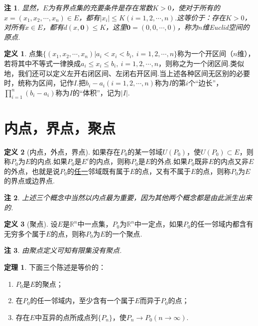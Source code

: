 \documentclass[lang=cn,12pt]{ctexart}
\theoremstyle{definition}
\newtheorem{definition}{定义}
\newtheorem{theorem}{定理}
\theoremstyle{plain}
\newtheorem*{remark}{注}
\begin{document}
\begin{remark}
	显然，$E$为有界点集的充要条件是存在常数$K>0$，使对于所有的$x=(x_1,x_2,\cdots,x_n)\in E$，都有$|x_i|\leqslant K(i=1,2,\cdots,n)$.这等价于：存在$K>0$，对所有$x\in E$，都有$d(x,\mathbf{0})\leqslant K$，这里$\mathbf{0}=(0,0,\cdots,0)$，称为$n$维Euclid空间的原点.
\end{remark}
\begin{definition}
	点集$\{(x_1,x_2,\cdots,x_n)|a_i<x_i<b_i,\ i=1,2,\cdots,n\}$称为一个{\heiti 开区间}（$n$维），若将其中不等式一律换成$a_i\leqslant x_i\leqslant b_i,\ i=1,2,\cdots,n$，则称之为一个{\heiti 闭区间}.类似地，我们还可以定义左开右闭区间、左闭右开区间.当上述各种区间无区别的必要时，统称为{\heiti 区间}，记作$I$.把$b_i-a_i(i=1,2,\cdots,n)$称为$I$的第$i$个“边长”，$\prod\limits_{i=1}^{n}(b_i-a_i)$称为$I$的“体积”，记为$|I|$.
\end{definition}
\section{内点，界点，聚点}
\begin{definition}[内点，外点，界点]
	如果存在$P_0$的某一邻域$U(P_0)$，使$U(P_0)\subset E$，则称$P_0$为$E$的{\heiti 内点}.如果$P_0$是$E^c$的内点，则称$P_0$是$E$的{\heiti 外点}.如果$P_0$既非$E$的内点又非$E$的外点，也就是说$P_0$的\underline{任一}邻域既有属于$E$的点，又有不属于$E$的点，则称$P_0$为$E$的{\heiti 界点}或{\heiti 边界点}.
\end{definition}
\begin{remark}
	上述三个概念中当然以内点最为重要，因为其他两个概念都是由此派生出来的.
\end{remark}
\begin{definition}[聚点]
	设$E$是$\mathbb{R}^n$中一点集，$P_0$为$\mathbb{R}^n$中一定点，如果$P_0$的任一邻域内都含有无穷多个属于$E$的点，则称$P_0$为$E$的一个{\heiti 聚点}.
\end{definition}
\begin{remark}
	由聚点定义可知有限集没有聚点.
\end{remark}
\begin{theorem}\label{judian}
	下面三个陈述是等价的：
	\begin{enumerate}
		\item $P_0$是$E$的聚点；
		\item 在$P_0$的任一邻域内，至少含有一个属于$E$而异于$P_0$的点；
		\item 存在$E$中互异的点所成点列$\{P_n\}$，使$P_n\to P_0(n\to \infty)$.
	\end{enumerate}
\end{theorem}
\end{document}
